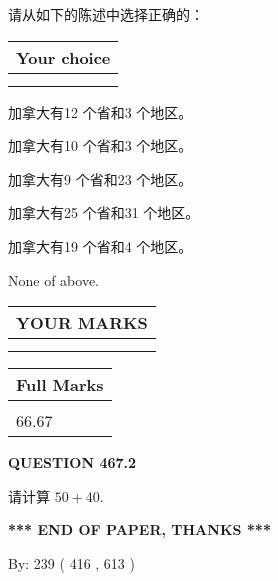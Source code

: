 \documentclass{ctexart}
\begin{document}
  
请从如下的陈述中选择正确的：
  
  
\noindent\hspace{3.0in} \begin{tabular}{|l|}
\hline
Your choice \\
\hline
 \\ 
 \\ 
\hline
\end{tabular}
  
  
 
 
加拿大有12 个省和3 个地区。
 
 
加拿大有10 个省和3 个地区。
 
 
加拿大有9 个省和23 个地区。
 
 
加拿大有25 个省和31 个地区。
 
 
加拿大有19 个省和4 个地区。
 
 
 None of above.
 
 
  
\vspace{0.2in}
  
\noindent\begin{tabular}{|l|}
\hline
 YOUR MARKS  \\
\hline
 \\ 
 \\ 
\hline
\end{tabular}
\hspace{0.05in} \begin{tabular}{|l|}
\hline
 Full Marks  \\
\hline
 \\ 
66.67 \\
\hline
\end{tabular}
{\textbf{\Large{QUESTION
467.2 
}}}
  
  
 
请计算 $ %
50 +  %
40 $.
 

 

 
   
   
 \vspace{0.2in}
 
   
   
   
   
\vspace{1.0in} 
{\textbf{\large{ *** END OF PAPER, THANKS *** }}} 
   
   
\hspace{1.0in} By: 
 239 ( 416 ,  613 )
   
\end{document}
